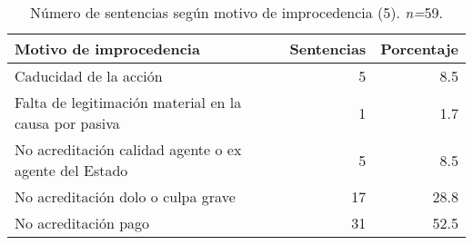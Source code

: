 \begin{table}[!htbp]
\centering
\caption{Número de sentencias según motivo de improcedencia (5). \textit{n=}59.} 
\label{tab:improcedencia}
\begin{tabular}{lrr}
  \hline
Motivo de improcedencia & Sentencias & Porcentaje \\ 
  \hline
Caducidad de la acción &  5 & 8.5 \\ 
  Falta de legitimación material en la causa por pasiva &  1 & 1.7 \\ 
  No acreditación calidad agente o ex agente del Estado &  5 & 8.5 \\ 
  No acreditación dolo o culpa grave & 17 & 28.8 \\ 
  No acreditación pago & 31 & 52.5 \\ 
   \hline
\end{tabular}
\end{table}
